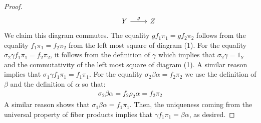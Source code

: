 \documentclass{amsart}
\begin{document}
\begin{proof}
\begin{equation*}
\begin{tikzcd}
            & Y \arrow[r, "g"] & Z 
        \end{tikzcd}
    \end{equation*}
    We claim this diagram commutes. The equality $gf_1\pi_1=gf_2\pi_2$ follows from the equality $f_1\pi_1=f_2\pi_2$ from the left most square of diagram (1). For the equality $\sigma_2\gamma f_1\pi_1=f_2\pi_2$, it follows from the definition of $\gamma$ which implies that $\sigma_2\gamma=1_Y$ and the commutativity of the left most square of diagram (1). A similar reason implies that $\sigma_1\gamma f_1\pi_1=f_1\pi_1$. For the equality $\sigma_2\beta\alpha=f_2\pi_2$ we use the definition of $\beta$ and the definition of $\alpha$ so that:
    \begin{align*}
        \sigma_2\beta\alpha=f_2\rho_2\alpha=f_2\pi_2
    \end{align*}
    A similar reason shows that $\sigma_1\beta\alpha=f_1\pi_1$. Then, the uniqueness coming from the universal property of fiber products implies that $\gamma f_1\pi_1=\beta\alpha$, as desired. 

    \vspace{0.1in}
    

\end{proof}
\end{document}
